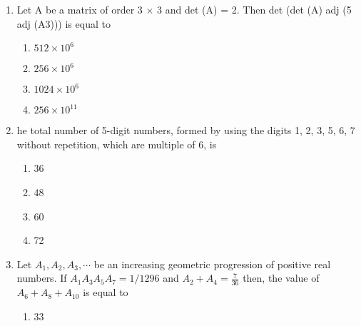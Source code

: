 \documentclass[journal]{IEEEtran}
\numberwithin{equation}{enumi}
\numberwithin{figure}{enumi}
\begin{document}
\begin{enumerate}
    2x + 3y - z = -2\\
    x + y + z = 4\\
    x - y + $|\lambda|$z = 4$\lambda$ - 4\\
    where $\lambda$$\in$ R, has no solution, then \\
    \begin{multicols}{4}
    \begin{enumerate}
        \item $\lambda = 7$
        \item $\lambda = -7$
        \item $\lambda = 8$
        \item $\lambda^2 = 1$
    \end{enumerate} 
    \end{multicols}
    \bigskip
    \item Let A be a matrix of order 3 $\times$ 3 and det (A) = 2. Then det (det (A) adj (5 adj (A3))) is equal to  
    \begin{multicols}{2}
    \begin{enumerate}
        \item $512\times 10^6$
        \item $256\times 10^6$
        \item $1024\times 10^6$
        \item $256\times 10^{11}$
    \end{enumerate} 
    \end{multicols}
    \bigskip
    \item he total number of 5-digit numbers, formed by using the digits 1, 2, 3, 5, 6, 7 without repetition, which are multiple of 6, is 
    \begin{multicols}{4}
    \begin{enumerate}
        \item 36
        \item 48
        \item 60
        \item 72
    \end{enumerate} 
    \end{multicols}
    \bigskip
    \item Let $A_1, A_2, A_3, \cdots $ be an increasing geometric progression of positive real numbers. If $A_1A_3A_5A_7 = 1/1296$ and $A_2 + A_4 = \frac{7}{36}$ then, the value of $A_6 + A_8 + A_10$ is equal to 
    \begin{multicols}{4}
    \begin{enumerate}
        \item $33$

\end{enumerate}
\end{multicols}$$
\end{enumerate}
\end{document}
